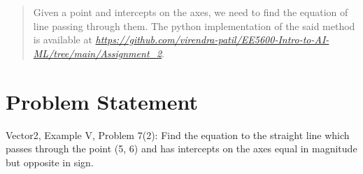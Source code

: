 \documentclass[journal,12pt]{IEEEtran}
\renewcommand\thesection{\arabic{section}}
\begin{document}
\renewcommand{\thetable}{\theenumi}
\begin{abstract}
Given a point and intercepts on the axes, we need to find the equation of line passing through them. The python implementation of the said method is available at  \href{https://github.com/virendra-patil/EE5600-Intro-to-AI-ML/tree/main/Assignment_1}{\emph{https://github.com/virendra-patil/EE5600-Intro-to-AI-ML/tree/main/Assignment\_2}}.
\end{abstract}
%
%

%
\section{Problem Statement}

Vector2, Example V, Problem 7(2): Find the equation to the straight line which passes through the point (5, 6) and has intercepts on the axes equal in magnitude but opposite in sign.\\\\

\end{document}
